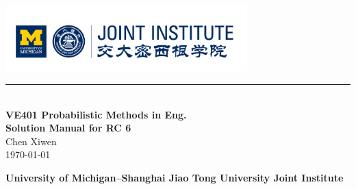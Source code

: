 \documentclass[12pt, a4paper]{article}
\newcommand{\HRule}{\rule{\linewidth}{0.5mm}}
\begin{document}
\renewcommand\arraystretch{1.5}
\setlength\parskip{.1\baselineskip}

\begin{titlepage}
	\begin{center}
		\includegraphics[width=0.7\textwidth]{./logo}\\
		\HRule\\[3cm]
		
		{\Huge\bfseries VE401 Probabilistic Methods in Eng.\\[0.5cm]Solution Manual for RC 6}\\[2cm]
		
		{\large Chen Xiwen}
		\\[1cm]
		{\large \today}
		\vfill
		
		\textbf{\small University of Michigan--Shanghai Jiao Tong University Joint Institute}
	\end{center}
\end{titlepage}


\newpage

\begin{spacing}{1.1}




  
\end{spacing}
\end{document}

